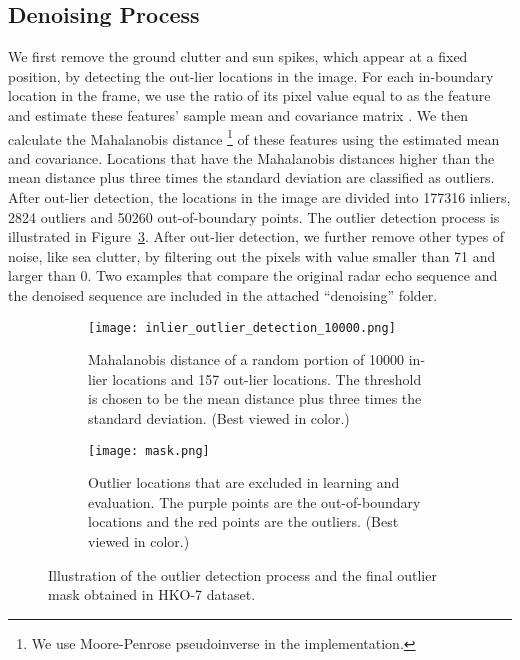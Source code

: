 \documentclass{article}
\begin{document}
\subsection{Denoising Process}
We first remove the ground clutter and sun spikes, which appear at a fixed position, by detecting the out-lier locations in the image. For each in-boundary location  in the frame, we use the ratio of its pixel value equal to  as the feature  and estimate these features' sample mean  and covariance matrix . We then calculate the Mahalanobis distance \footnote{We use Moore-Penrose pseudoinverse in the implementation.} of these features using the estimated mean and covariance. Locations that have the Mahalanobis distances higher than the mean distance plus three times the standard deviation are classified as outliers. After out-lier detection, the  locations in the image are divided into 177316 inliers, 2824 outliers and 50260 out-of-boundary points. The outlier detection process is illustrated in Figure~\ref{fig:outlier-detection}. After out-lier detection, we further remove other types of noise, like sea clutter, by filtering out the pixels with value smaller than 71 and larger than 0. Two examples that compare the original radar echo sequence and the denoised sequence are included in the attached ``denoising'' folder.
\begin{figure}[h!]
  \centering
  \begin{subfigure}[h!]{0.4\textwidth}
    \texttt{[image: inlier\_outlier\_detection\_10000.png]}
    \caption{Mahalanobis distance of a random portion of 10000 in-lier locations and 157 out-lier locations. The threshold is chosen to be the mean distance plus three times the standard deviation. (Best viewed in color.)}
    \label{fig:outlier-detection-mahdist} \end{subfigure}
  \quad
  \begin{subfigure}[h!]{0.4\textwidth}
    \texttt{[image: mask.png]}
    \caption{Outlier locations that are excluded in learning and evaluation. The purple points are the out-of-boundary locations and the red points are the outliers. (Best viewed in color.)}
    \label{fig:radar-outlier-mask} \end{subfigure}
  \caption{Illustration of the outlier detection process and the final outlier mask obtained in HKO-7 dataset.}
  \label{fig:outlier-detection}
\end{figure}
\end{document}
